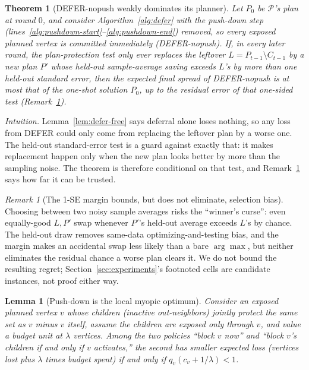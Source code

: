 \documentclass[preprint,11pt]{elsarticle}
\newtheorem{theorem}{Theorem}
\newtheorem{lemma}{Lemma}
\theoremstyle{definition}
\theoremstyle{remark}
\newtheorem{remark}{Remark}
\begin{document}
\begin{theorem}[DEFER-nopush weakly dominates its planner]\label{thm:defer-dominates}
Let $P_0$ be $\mathcal P$'s plan at round $0$, and consider Algorithm~\ref{alg:defer}
with the push-down step (lines~\ref{alg:pushdown-start}--\ref{alg:pushdown-end})
removed, so every exposed planned vertex is committed immediately
(DEFER-nopush). If, in every later round, the plan-protection test
only ever replaces the leftover $L=P_{t-1}\setminus C_{t-1}$ by a new plan
$P'$ whose held-out sample-average saving exceeds $L$'s by more than one
held-out standard error, then the expected final spread of
DEFER-nopush is at most that of the one-shot solution $P_0$, up to
the residual error of that one-sided test (Remark~\ref{rem:winners-curse}).
\end{theorem}

\emph{Intuition.} Lemma~\ref{lem:defer-free} says deferral alone loses
nothing, so any loss from DEFER could only come from replacing the leftover
plan by a worse one. The held-out standard-error test is a guard against
exactly that: it makes replacement happen only when the new plan looks
better by more than the sampling noise. The theorem is therefore
conditional on that test, and Remark~\ref{rem:winners-curse} says how far it
can be trusted.

\begin{remark}[The 1-SE margin bounds, but does not eliminate, selection
bias]\label{rem:winners-curse}
Choosing between two noisy sample averages risks the ``winner's curse'':
even equally-good $L,P'$ swap whenever $P'$'s held-out average exceeds
$L$'s by chance. The held-out draw removes same-data optimizing-and-testing
bias, and the margin makes an accidental swap less likely than a bare
$\arg\max$, but neither eliminates the residual chance a worse plan clears
it. We do not bound the resulting regret; Section~\ref{sec:experiments}'s
footnoted cells are candidate instances, not proof either way.
\end{remark}

\begin{lemma}[Push-down is the local myopic optimum]\label{lem:pushdown}
Consider an exposed planned vertex $v$ whose children (inactive
out-neighbors) jointly protect the same set as $v$ minus $v$ itself, assume
the children are exposed only through $v$, and value a budget unit at
$\lambda$ vertices. Among the two policies ``block $v$ now'' and ``block
$v$'s children if and only if $v$ activates,'' the second has smaller
expected loss (vertices lost plus $\lambda$ times budget spent) if and only
if $q_v(c_v+1/\lambda)<1$.
\end{lemma}
\end{document}
